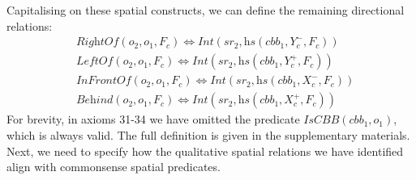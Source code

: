 \documentclass{article}
\begin{document}
Capitalising on these spatial constructs, we can define the remaining directional relations:
\begin{align}
  &  \textit{RightOf} (o_2,o_1,F_c) \Leftrightarrow  \textit{Int}(\textit{sr}_2,
    \textit{hs}(cbb_1,Y_{c}^{-},F_c)) \\
& \textit{LeftOf} (o_2,o_1,F_c) \Leftrightarrow  \textit{Int}(\textit{sr}_2,
 \textit{hs}(cbb_1,Y_{c}^{+},F_c)) \\
& \textit{InFrontOf}(o_2,o_1,F_c)  \Leftrightarrow  \textit{Int}(\textit{sr}_2,
 \textit{hs}(cbb_1,X_{c}^{-},F_c)) \\
 &\textit{Behind}(o_2,o_1,F_c)  \Leftrightarrow  \textit{Int}(\textit{sr}_2,
 \textit{hs}(cbb_1,X_{c}^{+},F_c)) 
\end{align}
For brevity, in axioms 31-34 we have omitted the predicate $\textit{IsCBB}(cbb_1,o_1)$, which is always valid. The full definition is given in the supplementary materials.
Next, we need to specify how the qualitative spatial relations we have identified align with commonsense spatial predicates. 
\end{document}
